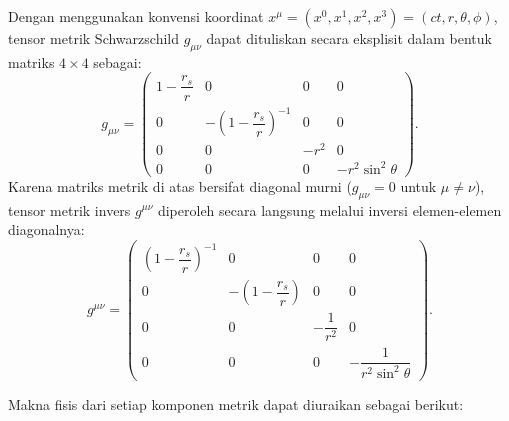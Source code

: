 Dengan menggunakan konvensi koordinat $x^\mu = (x^0, x^1, x^2, x^3) = (ct, r, \theta, \phi)$, tensor metrik Schwarzschild $g_{\mu\nu}$ dapat dituliskan secara eksplisit dalam bentuk matriks $4 \times 4$ sebagai:
\begin{equation}
    g_{\mu\nu} =
    \begin{pmatrix}
        1 - \dfrac{r_s}{r} & 0 & 0 & 0 \\[10pt]
        0 & -\left(1 - \dfrac{r_s}{r}\right)^{-1} & 0 & 0 \\[10pt]
        0 & 0 & -r^2 & 0 \\[10pt]
        0 & 0 & 0 & -r^2 \sin^2\!\theta
    \end{pmatrix}.
    \label{eq:schwarzschild-matrix}
\end{equation}
Karena matriks metrik di atas bersifat diagonal murni ($g_{\mu\nu} = 0$ untuk $\mu \neq \nu$), tensor metrik invers $g^{\mu\nu}$ diperoleh secara langsung melalui inversi elemen-elemen diagonalnya:
\begin{equation}
    g^{\mu\nu} =
    \begin{pmatrix}
        \left(1 - \dfrac{r_s}{r}\right)^{-1} & 0 & 0 & 0 \\[10pt]
        0 & -\left(1 - \dfrac{r_s}{r}\right) & 0 & 0 \\[10pt]
        0 & 0 & -\dfrac{1}{r^2} & 0 \\[10pt]
        0 & 0 & 0 & -\dfrac{1}{r^2 \sin^2\!\theta}
    \end{pmatrix}.
    \label{eq:schwarzschild-inverse-matrix}
\end{equation}

Makna fisis dari setiap komponen metrik dapat diuraikan sebagai berikut:

